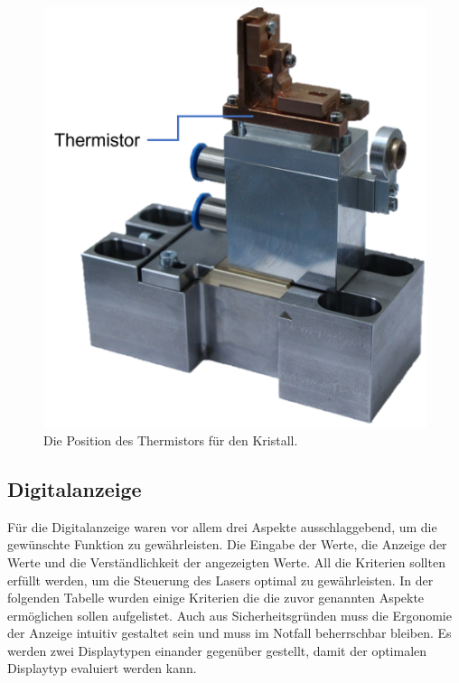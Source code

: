 \begin{figure}[H]
    \centering
    \includegraphics[scale=0.5, trim=0mm 70mm 0mm 0mm, clip]{98_images/thermistor_cr.png}
    \caption{Die Position des Thermistors für den Kristall.}
    \label{fig:_thermistor_cr}
\end{figure}

\subsection{Digitalanzeige}
Für die Digitalanzeige waren vor allem drei Aspekte ausschlaggebend, um die gewünschte Funktion zu gewährleisten. Die Eingabe der Werte, die Anzeige der Werte und die Verständlichkeit der angezeigten Werte. All die Kriterien sollten erfüllt werden, um die Steuerung des Lasers optimal zu gewährleisten. In der folgenden Tabelle wurden einige Kriterien die die zuvor genannten Aspekte ermöglichen sollen aufgelistet. Auch aus Sicherheitsgründen muss die Ergonomie der Anzeige intuitiv gestaltet sein und muss im Notfall beherrschbar bleiben. Es werden zwei Displaytypen einander gegenüber gestellt, damit der optimalen Displaytyp evaluiert werden kann.

